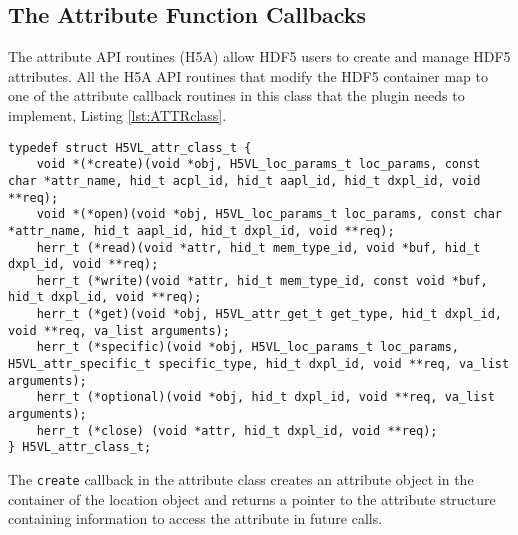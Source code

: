 \subsection{The Attribute Function Callbacks}
The attribute API routines (H5A) allow HDF5 users to create and manage
HDF5 attributes. All the H5A API routines that modify the HDF5
container map to one of the attribute callback routines in this
class that the plugin needs to implement, Listing \ref{lst:ATTRclass}.

\begin{lstlisting}[caption={Structure for attribute callback routines, H5VLpublic.h}, captionpos=b, label={lst:ATTRclass}]
typedef struct H5VL_attr_class_t {
    void *(*create)(void *obj, H5VL_loc_params_t loc_params, const char *attr_name, hid_t acpl_id, hid_t aapl_id, hid_t dxpl_id, void **req);
    void *(*open)(void *obj, H5VL_loc_params_t loc_params, const char *attr_name, hid_t aapl_id, hid_t dxpl_id, void **req);
    herr_t (*read)(void *attr, hid_t mem_type_id, void *buf, hid_t dxpl_id, void **req);
    herr_t (*write)(void *attr, hid_t mem_type_id, const void *buf, hid_t dxpl_id, void **req);
    herr_t (*get)(void *obj, H5VL_attr_get_t get_type, hid_t dxpl_id, void **req, va_list arguments);
    herr_t (*specific)(void *obj, H5VL_loc_params_t loc_params, H5VL_attr_specific_t specific_type, hid_t dxpl_id, void **req, va_list arguments);
    herr_t (*optional)(void *obj, hid_t dxpl_id, void **req, va_list arguments);
    herr_t (*close) (void *attr, hid_t dxpl_id, void **req);
} H5VL_attr_class_t;
\end{lstlisting}

The \texttt{create} callback in the attribute class creates an
attribute object in the container of the location object and
returns a pointer to the attribute structure containing information to
access the attribute in future calls. \bigskip

